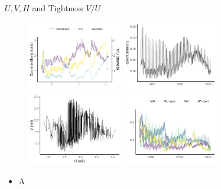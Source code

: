 \documentclass[aspectratio=169]{beamer}
\begin{document}
\begin{frame}{$U,V,H$ and Tightness $V/U$}
    \begin{figure}[!ht]
  \begin{center}
  \includegraphics[width = 0.37\textwidth]
  {figuretable/unemployed_vacancy_month_aggregate.png}
  \includegraphics[width = 0.37\textwidth]
  {figuretable/hire_month_aggregate.png}
  \includegraphics[width = 0.37\textwidth]
  {figuretable/unemployed_vacancies_berveridge_month_aggregate.png}
  \includegraphics[width = 0.37\textwidth]
  {figuretable/job_finding_rate_worker_finding_rate_month_aggregate.png}
  \end{center}
  \footnotesize
\end{figure} 
\begin{itemize}
    \item A
\end{itemize}
\end{frame}
\end{document}
